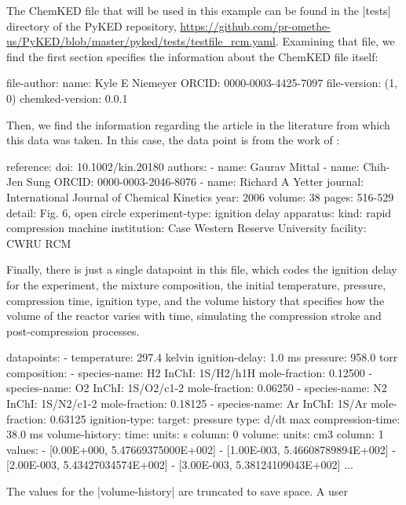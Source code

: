 \documentclass[12pt]{ussci}
\newcommand\ck{ChemKED}
\begin{document}
The \ck{} file that will be used in this example can be found in the
\python|tests| directory of the PyKED repository,
\url{https://github.com/pr-omethe-us/PyKED/blob/master/pyked/tests/testfile_rcm.yaml}.
Examining that file, we find the first section specifies the information about
the \ck{} file itself:
%
\begin{yamlbox}
file-author:
  name: Kyle E Niemeyer
  ORCID: 0000-0003-4425-7097
file-version: (1, 0)
chemked-version: 0.0.1
\end{yamlbox}
%
Then, we find the information regarding the article in the literature from which
this data was taken. In this case, the data point is from the work of
\textcite{Mittal2006a}:
%
\begin{yamlbox}
reference:
  doi: 10.1002/kin.20180
  authors:
    - name: Gaurav Mittal
    - name: Chih-Jen Sung
      ORCID: 0000-0003-2046-8076
    - name: Richard A Yetter
  journal: International Journal of Chemical Kinetics
  year: 2006
  volume: 38
  pages: 516-529
  detail: Fig. 6, open circle
experiment-type: ignition delay
apparatus:
  kind: rapid compression machine
  institution: Case Western Reserve University
  facility: CWRU RCM
\end{yamlbox}
%
Finally, there is just a single datapoint in this file, which codes the ignition
delay for the experiment, the mixture composition, the initial temperature,
pressure, compression time, ignition type, and the volume history that specifies
how the volume of the reactor varies with time, simulating the compression
stroke and post-compression processes.
%
\begin{yamlbox}
datapoints:
  - temperature: 297.4 kelvin
    ignition-delay: 1.0 ms
    pressure: 958.0 torr
    composition:
      - species-name: H2
        InChI: 1S/H2/h1H
        mole-fraction: 0.12500
      - species-name: O2
        InChI: 1S/O2/c1-2
        mole-fraction: 0.06250
      - species-name: N2
        InChI: 1S/N2/c1-2
        mole-fraction: 0.18125
      - species-name: Ar
        InChI: 1S/Ar
        mole-fraction: 0.63125
    ignition-type:
      target: pressure
      type: d/dt max
    compression-time: 38.0 ms
    volume-history:
      time:
        units: s
        column: 0
      volume:
        units: cm3
        column: 1
      values:
        - [0.00E+000, 5.47669375000E+002]
        - [1.00E-003, 5.46608789894E+002]
        - [2.00E-003, 5.43427034574E+002]
        - [3.00E-003, 5.38124109043E+002]
        ...
\end{yamlbox}
%
The values for the \yaml|volume-history| are truncated to save space. A user
\end{document}
